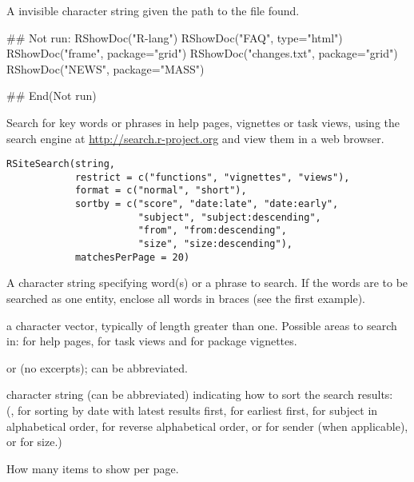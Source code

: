 %
\begin{Value}
A invisible character string given the path to the file found.
\end{Value}
%
\begin{Examples}
\begin{ExampleCode}
## Not run: 
RShowDoc("R-lang")
RShowDoc("FAQ", type="html")
RShowDoc("frame", package="grid")
RShowDoc("changes.txt", package="grid")
RShowDoc("NEWS", package="MASS")

## End(Not run)
\end{ExampleCode}
\end{Examples}
%
\begin{Description}\relax
Search for key words or phrases in
help pages, vignettes or task views, using the search engine
at \url{http://search.r-project.org} and view them in a web browser.
\end{Description}
%
\begin{Usage}
\begin{verbatim}
RSiteSearch(string,
            restrict = c("functions", "vignettes", "views"),
            format = c("normal", "short"),
            sortby = c("score", "date:late", "date:early",
                       "subject", "subject:descending",
                       "from", "from:descending",
                       "size", "size:descending"),
            matchesPerPage = 20)
\end{verbatim}
\end{Usage}
%
\begin{Arguments}
\begin{ldescription}
\item[\code{string}] A character string specifying word(s) or a phrase to
search.  If the words are to be searched as one entity, enclose all
words in braces (see the first example).
\item[\code{restrict}] a character vector, typically of length greater than one.
Possible areas to search in:
 for help pages,
 for task views and
 for package vignettes.
\item[\code{format}]  or  (no excerpts); can be
abbreviated.
\item[\code{sortby}] character string (can be abbreviated) indicating how to
sort the search results:\\{}
(,
 for sorting by date with latest results first,
 for earliest first,
 for subject in alphabetical order,
 for reverse alphabetical order,
 or  for sender (when applicable),
 or  for size.)
\item[\code{matchesPerPage}] How many items to show per page.
\end{ldescription}
\end{Arguments}
